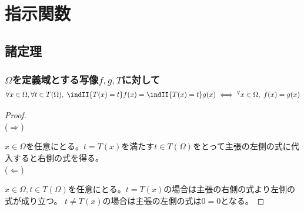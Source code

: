 \chapter{指示関数}
    \section{諸定理}
        \subsection{\texorpdfstring{$\Omega$}{Ω}を定義域とする写像\texorpdfstring{$f,g,T$}{f,g,T}に対して\texorpdfstring{$\forall x\in\Omega,\forall t\in T(\Omega),\; \indII{T(x)=t}f(x) = \indII{T(x)=t}g(x) \iff ^\forall x\in\Omega,\;f(x)=g(x)$}{∀x∈Ω, ∀t∈T(Ω), 1(T(x)=t)f(x) = 1(T(x)=t)g(x) ⇔ ∀x∈Ω, f(x)=g(x)}}
            \begin{proof}
                \quad\\
                ($\Rightarrow$)
                \par
                $x\in\Omega$を任意にとる。$t=T(x)$を満たす$t\in T(\Omega)$をとって主張の左側の式に代入すると右側の式を得る。\\
                ($\Leftarrow$)
                \par
                $x\in\Omega,t\in T(\Omega)$を任意にとる。$t=T(x)$の場合は主張の右側の式より左側の式が成り立つ。
                $t\neq T(x)$の場合は主張の左側の式は$0=0$となる。
            \end{proof}